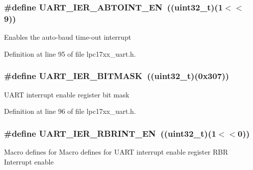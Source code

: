\hypertarget{group___u_a_r_t___private___macros_gac6579cde413efce70ee1103ef278368f}{
\subsubsection[{\-U\-A\-R\-T\-\_\-\-I\-E\-R\-\_\-\-A\-B\-T\-O\-I\-N\-T\-\_\-\-E\-N}]{\setlength{\rightskip}{0pt plus 5cm}\#define {\bf \-U\-A\-R\-T\-\_\-\-I\-E\-R\-\_\-\-A\-B\-T\-O\-I\-N\-T\-\_\-\-E\-N}~((uint32\-\_\-t)(1$<$$<$9))}}\label{group___u_a_r_t___private___macros_gac6579cde413efce70ee1103ef278368f}
\-Enables the auto-\/baud time-\/out interrupt 

\-Definition at line 95 of file lpc17xx\-\_\-uart.\-h.

\hypertarget{group___u_a_r_t___private___macros_ga101e57e41855d1262e9d9b747854542f}{
\subsubsection[{\-U\-A\-R\-T\-\_\-\-I\-E\-R\-\_\-\-B\-I\-T\-M\-A\-S\-K}]{\setlength{\rightskip}{0pt plus 5cm}\#define {\bf \-U\-A\-R\-T\-\_\-\-I\-E\-R\-\_\-\-B\-I\-T\-M\-A\-S\-K}~((uint32\-\_\-t)(0x307))}}\label{group___u_a_r_t___private___macros_ga101e57e41855d1262e9d9b747854542f}
\-U\-A\-R\-T interrupt enable register bit mask 

\-Definition at line 96 of file lpc17xx\-\_\-uart.\-h.

\hypertarget{group___u_a_r_t___private___macros_gad6400102a6ec4fa634656b7ef18d1eba}{
\subsubsection[{\-U\-A\-R\-T\-\_\-\-I\-E\-R\-\_\-\-R\-B\-R\-I\-N\-T\-\_\-\-E\-N}]{\setlength{\rightskip}{0pt plus 5cm}\#define {\bf \-U\-A\-R\-T\-\_\-\-I\-E\-R\-\_\-\-R\-B\-R\-I\-N\-T\-\_\-\-E\-N}~((uint32\-\_\-t)(1$<$$<$0))}}\label{group___u_a_r_t___private___macros_gad6400102a6ec4fa634656b7ef18d1eba}
\-Macro defines for \-Macro defines for \-U\-A\-R\-T interrupt enable register \-R\-B\-R \-Interrupt enable 

